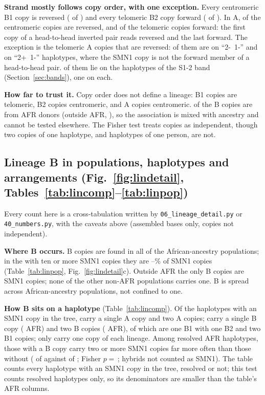 \textbf{Strand mostly follows copy order, with one exception.} Every centromeric B1 copy is reversed (\linBoneCenRev{} of
\linBoneCen) and every telomeric B2 copy forward (\linBtwoTelFwd{} of \linBtwoTel). In A, \linACenRev{} of the
\linACen{} centromeric copies are reversed, and \linATelFwd{} of the \linATel{} telomeric copies forward: the first
copy of a head-to-head inverted pair reads reversed and the last forward. The exception is the \linATelRev{} telomeric
A copies that are reversed: \linATelRevTwoMOneM{} of them are on ``2-~1-'' and \linATelRevTwoPOneM{} on ``2+~1-''
haplotypes, where the SMN1 copy is not the forward member of a head-to-head pair. \linATelRevBand{} of them lie on the \linBandTwoN{} haplotypes of the S1-2 band
(Section~\ref{sec:bands}), one on each.

\textbf{How far to trust it.} Copy order does not define a lineage: \linBoneTel{} B1 copies are telomeric, \linBtwoCen{}
B2 copies centromeric, and \linACen{} A copies centromeric. \linBAfr{} of the \linB{} B copies are from AFR donors
(outside AFR, \linBNonAfrPops), so the association is mixed with ancestry and cannot be tested elsewhere. The Fisher
test treats copies as independent, though two copies of one haplotype, and haplotypes of one person, are not.

\subsection{Lineage B in populations, haplotypes and arrangements (Fig.~\ref{fig:lindetail}, Tables~\ref{tab:lincomp}--\ref{tab:linpop})}\label{sec:lindetail}
Every count here is a cross-tabulation written by \texttt{06\_lineage\_detail.py} or \texttt{40\_numbers.py}, with the
caveats above (assembled bases only, copies not independent).

\textbf{Where B occurs.} B copies are found in all \ldAfrPopsB{} of the \ldAfrPops{} African-ancestry populations; in the
\ldAfrPopsBig{} with ten or more SMN1 copies they are \ldShareMin--\ldShareMax\% of SMN1 copies (Table~\ref{tab:linpop},
Fig.~\ref{fig:lindetail}c). Outside AFR the only B copies are \linBNonAfrPops{} SMN1 copies; none of the other
\ldNonAfrNoB{} non-AFR populations carries one. B is spread across African-ancestry populations, not confined to one.

\textbf{How B sits on a haplotype} (Table~\ref{tab:lincomp}). Of the \ldHaps{} haplotypes with an SMN1 copy in the tree,
\ldCompA{} carry a single A copy and \ldCompAA{} two A copies; \ldCompB{} carry a single B copy (\ldCompBAfr{} AFR) and
\ldCompBB{} two B copies (\ldCompBBAfr{} AFR), of which \linMixHaps{} are one B1 with one B2 and \linMkOneOne{} two B1
copies; only \ldCompAB{} carry one copy of each lineage. Among resolved AFR haplotypes, those with a B copy carry two
or more SMN1 copies far more often than those without (\ldTestBMulti{} of \ldTestBN{} against \ldTestNoBMulti{} of
\ldTestNoBN; Fisher $p=$\,\ldTestP; hybrids not counted as SMN1). The table counts every haplotype with an SMN1 copy in the tree, resolved or not; this test counts resolved
haplotypes only, so its denominators are smaller than the table's AFR columns.

